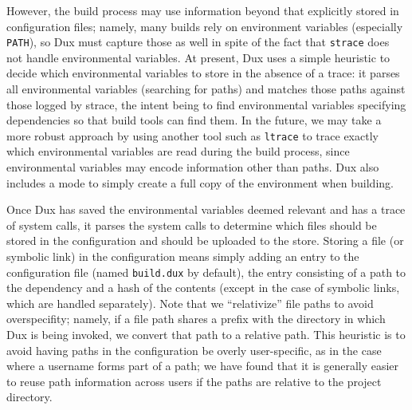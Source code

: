 \documentclass[10pt,conference]{IEEEtran}
\begin{document}
However, the build process may use information beyond that explicitly stored in configuration files; namely,
many builds rely on environment variables (especially \texttt{PATH}), so Dux must capture those as well
in spite of the fact that \texttt{strace} does not handle environmental variables. At present, Dux uses a
simple heuristic to decide which environmental variables to store in the absence of a trace: it parses
all environmental variables (searching for paths) and matches those paths against those logged by strace,
the intent being to find environmental variables specifying dependencies so that build tools can find them.
In the future, we may take a more robust approach by using another tool such as \texttt{ltrace} to trace
exactly which environmental variables are read during the build process, since environmental variables may
encode information other than paths. Dux also includes a mode to simply create a full copy of the environment
when building.

Once Dux has saved the environmental variables deemed relevant and has a trace of system calls, it parses
the system calls to determine which files should be stored in the configuration and should be uploaded to
the store. Storing a file (or symbolic link) in the configuration means simply adding an entry to the
configuration file (named \texttt{build.dux} by default), the entry consisting of a path to the dependency
and a hash of the contents
(except in the case of symbolic links, which are handled separately).
 Note that we ``relativize'' file paths to avoid overspecifity; namely,
if a file path shares a prefix with the directory in which Dux is being invoked, we convert that path to
a relative path. This heuristic is to avoid having paths in the configuration be overly user-specific, as in the
case where a username forms part of a path; we have found that it is generally easier to reuse path information
across users if the paths are relative to the project directory.
\end{document}
